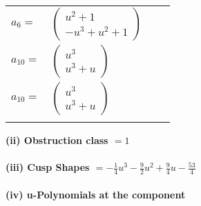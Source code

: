 \documentclass[1p]{elsarticle_modified}
\theoremstyle{definition}
\begin{document}
\begin{tabular}{m{7pt} m{180pt} m{7pt} m{180pt} }
\flushright $a_{6}=$&$\begin{pmatrix}u^2+1\\- u^3+u^2+1\end{pmatrix}$ \\
\flushright $a_{10}=$&$\begin{pmatrix}u^3\\u^3+u\end{pmatrix}$\\ \flushright $a_{10}=$&$\begin{pmatrix}u^3\\u^3+u\end{pmatrix}$\\&\end{tabular}
\flushleft \textbf{(ii) Obstruction class $= 1$}\\~\\
\flushleft \textbf{(iii) Cusp Shapes $= -\frac{1}{4} u^3-\frac{9}{2} u^2+\frac{9}{4} u-\frac{53}{4}$}\\~\\
\newpage\renewcommand{\arraystretch}{1}
\flushleft \textbf{(iv) u-Polynomials at the component}\newline \\
\end{document}
